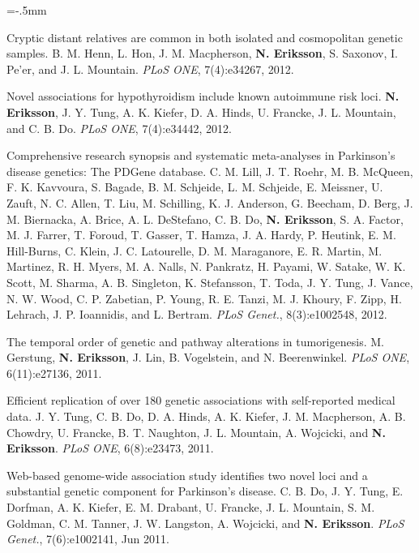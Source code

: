 \documentclass[11pt]{article}
\newenvironment{papers}[1][1]
	{\vspace{-2ex}\leftmargini=16.1mm%
	 \begin{revnumerate}[{#1}]\itemsep=-.5mm}
	{\end{revnumerate}\vspace{-2ex}}
\def\paper{\item}
\def\paperyear#1{\item[\addtocounter{enumi}{-1}%
		 {\makebox[0mm][r]{\makebox[14mm]{#1\hfill\arabic{enumi}.}}}]}
\begin{document}
\begin{papers}[25]
            \paper
        Cryptic distant relatives are common in both isolated and cosmopolitan genetic samples.
        B. M. Henn, L. Hon, J. M. Macpherson, \textbf{N. Eriksson}, S. Saxonov, I. Pe'er, and J. L. Mountain.
        \textit{PLoS ONE}, 7(4):e34267, 2012.

            \paper
        Novel associations for hypothyroidism include known autoimmune risk loci.
        \textbf{N. Eriksson}, J. Y. Tung, A. K. Kiefer, D. A. Hinds, U. Francke, J. L. Mountain, and C. B. Do.
        \textit{PLoS ONE}, 7(4):e34442, 2012.

            \paper
        Comprehensive research synopsis and systematic meta-analyses in Parkinson's disease genetics: The PDGene database.
        C. M. Lill, J. T. Roehr, M. B. McQueen, F. K. Kavvoura, S. Bagade, B. M.  Schjeide, L. M. Schjeide, E. Meissner, U. Zauft, N. C. Allen, T. Liu, M. Schilling, K. J. Anderson, G. Beecham, D. Berg, J. M. Biernacka, A. Brice, A. L. DeStefano, C. B. Do, \textbf{N. Eriksson}, S. A. Factor, M. J. Farrer, T. Foroud, T. Gasser, T. Hamza, J. A. Hardy, P. Heutink, E. M. Hill-Burns, C. Klein, J. C. Latourelle, D. M. Maraganore, E. R. Martin, M. Martinez, R. H. Myers, M. A. Nalls, N. Pankratz, H. Payami, W. Satake, W. K. Scott, M. Sharma, A. B. Singleton, K. Stefansson, T. Toda, J. Y. Tung, J. Vance, N. W. Wood, C. P. Zabetian, P. Young, R. E. Tanzi, M. J. Khoury, F. Zipp, H. Lehrach, J. P. Ioannidis, and L. Bertram.
        \textit{PLoS Genet.}, 8(3):e1002548, 2012.

     
                \paperyear{2011}
        The temporal order of genetic and pathway alterations in tumorigenesis.
        M. Gerstung, \textbf{N. Eriksson}, J. Lin, B. Vogelstein, and N. Beerenwinkel.
        \textit{PLoS ONE}, 6(11):e27136, 2011.

            \paper
        Efficient replication of over 180 genetic associations with self-reported medical data.
        J. Y. Tung, C. B. Do, D. A. Hinds, A. K. Kiefer, J. M. Macpherson, A. B.  Chowdry, U. Francke, B. T. Naughton, J. L. Mountain, A. Wojcicki, and \textbf{N. Eriksson}.
        \textit{PLoS ONE}, 6(8):e23473, 2011.

            \paper
        Web-based genome-wide association study identifies two novel loci and a substantial genetic component for Parkinson's disease.
        C. B. Do, J. Y. Tung, E. Dorfman, A. K. Kiefer, E. M. Drabant, U. Francke, J. L. Mountain, S. M. Goldman, C. M. Tanner, J. W. Langston, A. Wojcicki, and \textbf{N. Eriksson}.
        \textit{PLoS Genet.}, 7(6):e1002141, Jun 2011.


\end{papers}
\end{document}
